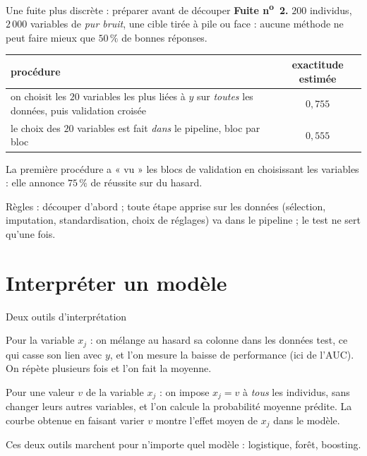 \documentclass[aspectratio=169,11pt]{beamer}
\begin{document}
\begin{frame}{Une fuite plus discrète : préparer avant de découper}
  \small
  \textbf{Fuite n\textsuperscript{o}~2.} $200$ individus, $2\,000$ variables de \emph{pur bruit}, une cible tirée à pile ou face : aucune méthode ne peut faire mieux que $50\,\%$ de bonnes réponses.
  \begin{center}
    \renewcommand{\arraystretch}{1.25}
    \begin{tabular}{p{}c}
      \toprule
      procédure & exactitude estimée \\
      \midrule
      on choisit les $20$ variables les plus liées à $y$ sur \emph{toutes} les données, puis validation croisée & $0{,}755$ \\
      le choix des $20$ variables est fait \emph{dans} le pipeline, bloc par bloc & $0{,}555$ \\
      \bottomrule
    \end{tabular}
  \end{center}
  La première procédure a « vu » les blocs de validation en choisissant les variables : elle annonce $75\,\%$ de réussite sur du hasard.
  \begin{aretenir}
    Règles : découper d'abord ; toute étape apprise sur les données (sélection, imputation, standardisation, choix de réglages) va dans le pipeline ; le test ne sert qu'une fois.
  \end{aretenir}
\end{frame}

\section{Interpréter un modèle}

\begin{frame}{Deux outils d'interprétation}
  \begin{definition}
    Pour la variable $x_j$ : on mélange au hasard sa colonne dans les données test, ce qui casse son lien avec $y$, et l'on mesure la baisse de performance (ici de l'AUC). On répète plusieurs fois et l'on fait la moyenne.
  \end{definition}
  \begin{definition}
    Pour une valeur $v$ de la variable $x_j$ : on impose $x_j=v$ à \emph{tous} les individus, sans changer leurs autres variables, et l'on calcule la probabilité moyenne prédite. La courbe obtenue en faisant varier $v$ montre l'effet moyen de $x_j$ dans le modèle.
  \end{definition}
  {\small\color{cnfGris}Ces deux outils marchent pour n'importe quel modèle : logistique, forêt, boosting.}
\end{frame}
\end{document}
